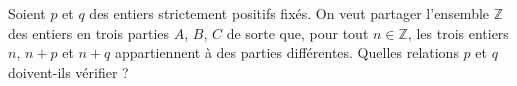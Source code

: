 Soient $p$ et $q$ des entiers strictement positifs fixés. On veut partager l'ensemble $\mathbb{Z}$ des entiers en trois parties $A$, $B$, $C$ de sorte que, pour tout $n \in \mathbb{Z}$, les trois entiers $n$, $n + p$ et $n + q$ appartiennent à des parties différentes. Quelles relations $p$ et $q$ doivent-ils vérifier ?
